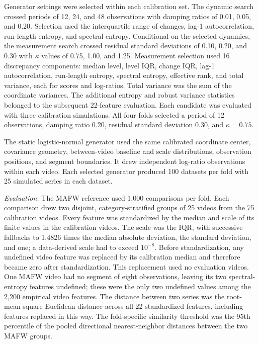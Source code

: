 \documentclass[
]{article}
\begin{document}
Generator settings were selected within each calibration set. The
dynamic search crossed periods of 12, 24, and 48 observations with
damping ratios of 0.01, 0.05, and 0.20. Selection used the interquartile
range of changes, lag-1 autocorrelation, run-length entropy, and
spectral entropy. Conditional on the selected dynamics, the measurement
search crossed residual standard deviations of 0.10, 0.20, and 0.30 with
\(\kappa\) values of 0.75, 1.00, and 1.25. Measurement selection used 16
discrepancy components: median level, level IQR, change IQR, lag-1
autocorrelation, run-length entropy, spectral entropy, effective rank,
and total variance, each for scores and log-ratios. Total variance was
the sum of the coordinate variances. The additional entropy and robust
variance statistics belonged to the subsequent 22-feature evaluation.
Each candidate was evaluated with three calibration simulations. All
four folds selected a period of 12 observations, damping ratio 0.20,
residual standard deviation 0.30, and \(\kappa=0.75\).

The static logistic-normal generator used the same calibrated coordinate
center, covariance geometry, between-video baseline and scale
distributions, observation positions, and segment boundaries. It drew
independent log-ratio observations within each video. Each selected
generator produced 100 datasets per fold with 25 simulated series in
each dataset.

\emph{Evaluation.} The MAFW reference used 1,000 comparisons per fold.
Each comparison drew two disjoint, category-stratified groups of 25
videos from the 75 calibration videos. Every feature was standardized by
the median and scale of its finite values in the calibration videos. The
scale was the IQR, with successive fallbacks to 1.4826 times the median
absolute deviation, the standard deviation, and one; a data-derived
scale had to exceed \(10^{-8}\). Before standardization, any undefined
video feature was replaced by its calibration median and therefore
became zero after standardization. This replacement used no evaluation
videos. One MAFW video had no segment of eight observations, leaving its
two spectral-entropy features undefined; these were the only two
undefined values among the 2,200 empirical video features. The distance
between two series was the root-mean-square Euclidean distance across
all 22 standardized features, including features replaced in this way.
The fold-specific similarity threshold was the 95th percentile of the
pooled directional nearest-neighbor distances between the two MAFW
groups.
\end{document}
